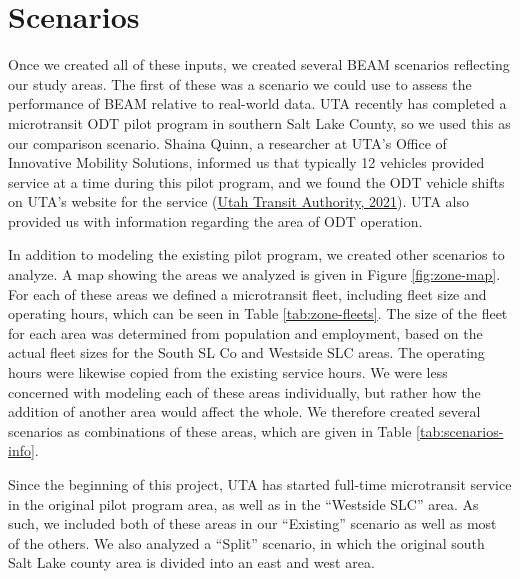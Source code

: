 \documentclass[
]{report}
\begin{document}
\hypertarget{scenario-configuration}{%
\section{Scenarios}\label{scenario-configuration}}

Once we created all of these inputs, we created several BEAM scenarios reflecting our study areas. The first of these was a scenario we could use to assess the performance of BEAM relative to real-world data. UTA recently has completed a microtransit ODT pilot program in southern Salt Lake County, so we used this as our comparison scenario. Shaina Quinn, a researcher at UTA's Office of Innovative Mobility Solutions, informed us that typically 12 vehicles provided service at a time during this pilot program, and we found the ODT vehicle shifts on UTA's website for the service (\protect\hyperlink{ref-SLCSouth}{Utah Transit Authority, 2021}). UTA also provided us with information regarding the area of ODT operation.

In addition to modeling the existing pilot program, we created other scenarios to analyze. A map showing the areas we analyzed is given in Figure \ref{fig:zone-map}. For each of these areas we defined a microtransit fleet, including fleet size and operating hours, which can be seen in Table \ref{tab:zone-fleets}. The size of the fleet for each area was determined from population and employment, based on the actual fleet sizes for the South SL Co and Westside SLC areas. The operating hours were likewise copied from the existing service hours. We were less concerned with modeling each of these areas individually, but rather how the addition of another area would affect the whole. We therefore created several scenarios as combinations of these areas, which are given in Table \ref{tab:scenarios-info}.

Since the beginning of this project, UTA has started full-time microtransit service in the original pilot program area, as well as in the ``Westside SLC'' area. As such, we included both of these areas in our ``Existing'' scenario as well as most of the others. We also analyzed a ``Split'' scenario, in which the original south Salt Lake county area is divided into an east and west area.
\end{document}
